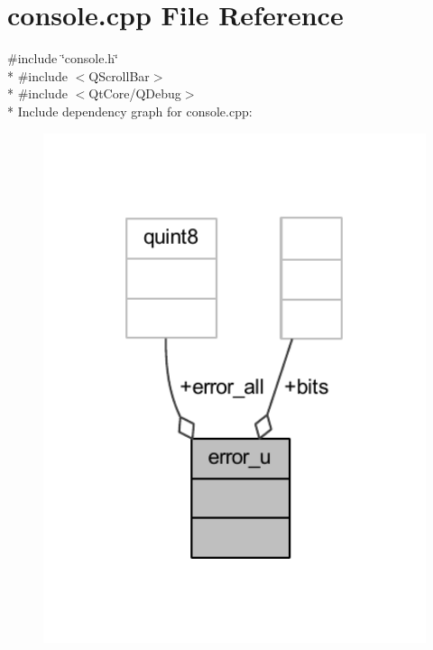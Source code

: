 \hypertarget{a00087}{\section{console.\+cpp File Reference}
\label{a00087}
}
{\ttfamily \#include \char`\"{}console.\+h\char`\"{}}\\*
{\ttfamily \#include $<$Q\+Scroll\+Bar$>$}\\*
{\ttfamily \#include $<$Qt\+Core/\+Q\+Debug$>$}\\*
Include dependency graph for console.\+cpp\+:
\nopagebreak
\begin{figure}[H]
\begin{center}
\leavevmode
\includegraphics[width=337pt]{d6/d82/a00243}
\end{center}
\end{figure}
